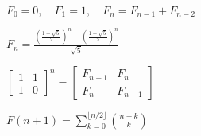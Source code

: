$F_0 = 0, \quad F_1 = 1, \quad F_n = F_{n-1} + F_{n-2}$

$F_n = \frac{\left(\frac{1+\sqrt5}2\right)^n-\left(\frac{1-\sqrt5}2\right)^n}{\sqrt5}$

$\begin{bmatrix}1 & 1 \\ 1 & 0\end{bmatrix}^n=\begin{bmatrix}
    F_{n+1} & F_{n} \\
    F_n & F_{n-1}
\end{bmatrix}$

$F(n+1)=\sum\limits_{k=0}^{\lfloor n/2\rfloor}\binom{n-k}{k}$
